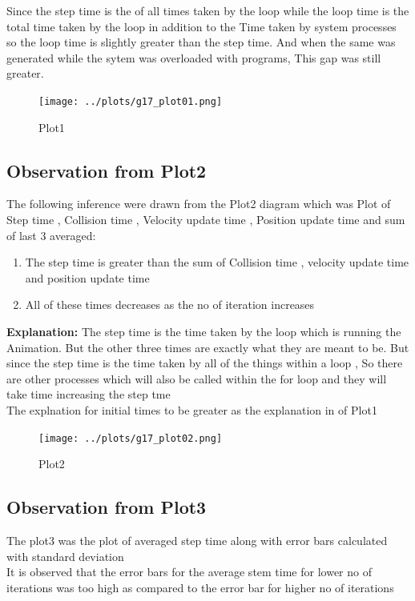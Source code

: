 \documentclass[11pt,]{article}
\begin{document}
\begin{singlespace}
Since the step time is the of all times taken by the loop while the loop time is the total time taken by the loop in addition to the Time 
taken by system processes so the loop time is slightly greater than the step time. And when the same was generated while the sytem was overloaded 
with programs, This gap was still greater.
\begin{figure}[!ht]
	\centering
	\caption{Plot1}
		\texttt{[image: ../plots/g17\_plot01.png]}
\end{figure}
\subsection{Observation from Plot2}
The following inference were drawn from the Plot2 diagram which was Plot of Step time , Collision time , Velocity update time , Position update time
and sum of last 3 averaged:
\begin{enumerate}
    \item The step time is greater than the sum of Collision time , velocity update time and position update time
    \item All of these times decreases as the no of iteration increases
\end{enumerate}
\textbf{Explanation:}
The step time is the time taken by the loop which is running the Animation. But the other three times are exactly what they are meant to be.
But since the step time is the time taken by all of the things within a loop , So there are other processes which will also be called within the for loop 
and they will take time increasing the step tme\\

The explnation for initial times to be greater as the explanation in of Plot1
\begin{figure}[!ht]
	\centering
	\caption{Plot2}
		\texttt{[image: ../plots/g17\_plot02.png]}
\end{figure}
\subsection{Observation from Plot3}
The plot3 was the plot of averaged step time along with error bars calculated with standard deviation\\

It is observed that the error bars for the average stem time for lower no of iterations was too high as compared to the error
 bar for higher no of iterations \\
 

\end{singlespace}
\end{document}
